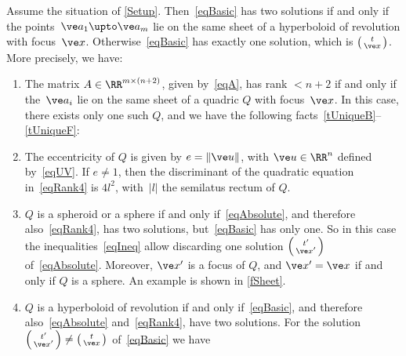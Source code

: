 \documentclass[reqno]{amsart}
\begin{document}
\begin{theorem} \label{tUnique}%
  Assume the situation of \cref{Setup}. Then~\eqref{eqBasic} has two
  solutions if and only if the points~$\ve a_1 \upto \ve a_m$ lie on
  the same sheet of a hyperboloid of revolution with focus~$\ve
  x$. Otherwise~\eqref{eqBasic} has exactly one solution, which is
  $\left(\begin{smallmatrix} t \\ \ve x\end{smallmatrix}\right)$. More
  precisely, we have:
  \begin{enumerate}[label=(\alph*)]
  \item \label{tUniqueA} The matrix $A \in \RR^{m \times (n+2)}$,
    given by~\eqref{eqA}, has rank $< n + 2$ if and only if
    the~$\ve a_i$ lie on the same sheet of a quadric $Q$ with
    focus~$\ve x$. In this case, there exists only one such $Q$, and
    we have the following facts~\ref{tUniqueB}--\ref{tUniqueF}:
  \item \label{tUniqueB} The eccentricity of $Q$ is given by
    $e = \lVert\ve u\rVert$, with $\ve u \in \RR^n$ defined
    by~\eqref{eqUV}. If $e \ne 1$, then the discriminant of the
    quadratic equation in~\eqref{eqRank4} is $4 l^2$, with~$|l|$ the
    semilatus rectum of $Q$.
  \item \label{tUniqueC} $Q$ is a spheroid or a sphere if and only
    if~\eqref{eqAbsolute}, and therefore also~\eqref{eqRank4}, has two
    solutions, but~\eqref{eqBasic} has only one. So in this case the
    inequalities~\eqref{eqIneq} allow discarding one solution
    $\left(\begin{smallmatrix} t' \\ \ve x'\end{smallmatrix}\right)$
    of~\eqref{eqAbsolute}. Moreover, $\ve x'$ is a focus of $Q$, and
    $\ve x' = \ve x$ if and only if $Q$ is a sphere. An example is
    shown in \cref{fSheet}.
  \item \label{tUniqueD} $Q$ is a hyperboloid of revolution if and
    only if~\eqref{eqBasic}, and therefore also~\eqref{eqAbsolute}
    and~\eqref{eqRank4}, have two solutions. For the solution
    $\left(\begin{smallmatrix} t' \\
        \ve x'\end{smallmatrix}\right) \ne \left(\begin{smallmatrix} t
        \\ \ve x\end{smallmatrix}\right)$ of~\eqref{eqBasic} we have

\end{enumerate}
\end{theorem}
\end{document}
